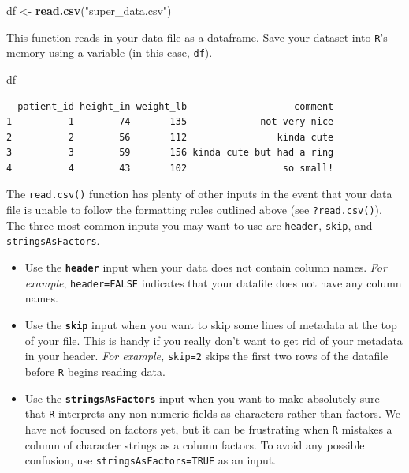 \documentclass[
]{book}
\newenvironment{Shaded}{\begin{snugshade}}{\end{snugshade}}
\newcommand{\KeywordTok}[1]{\textcolor[rgb]{0.13,0.29,0.53}{\textbf{#1}}}
\newcommand{\NormalTok}[1]{#1}
\newcommand{\StringTok}[1]{\textcolor[rgb]{0.31,0.60,0.02}{#1}}
\begin{document}
\begin{Shaded}
\begin{Highlighting}[]
\NormalTok{df <-}\StringTok{ }\KeywordTok{read.csv}\NormalTok{(}\StringTok{"super_data.csv"}\NormalTok{)}
\end{Highlighting}
\end{Shaded}

This function reads in your data file as a dataframe. Save your dataset into \texttt{R}'s memory using a variable (in this case, \texttt{df}).

\begin{Shaded}
\begin{Highlighting}[]
\NormalTok{df}
\end{Highlighting}
\end{Shaded}

\begin{verbatim}
  patient_id height_in weight_lb                   comment
1          1        74       135             not very nice
2          2        56       112                kinda cute
3          3        59       156 kinda cute but had a ring
4          4        43       102                 so small!
\end{verbatim}

The \texttt{read.csv()} function has plenty of other inputs in the event that your data file is unable to follow the formatting rules outlined above (see \texttt{?read.csv()}). The three most common inputs you may want to use are \texttt{header}, \texttt{skip}, and \texttt{stringsAsFactors}.

\begin{itemize}
\item
  Use the \textbf{\texttt{header}} input when your data does not contain column names. \emph{For example}, \texttt{header=FALSE} indicates that your datafile does not have any column names.
\item
  Use the \textbf{\texttt{skip}} input when you want to skip some lines of metadata at the top of your file. This is handy if you really don't want to get rid of your metadata in your header. \emph{For example,} \texttt{skip=2} skips the first two rows of the datafile before \texttt{R} begins reading data.
\item
  Use the \textbf{\texttt{stringsAsFactors}} input when you want to make absolutely sure that \texttt{R} interprets any non-numeric fields as characters rather than factors. We have not focused on factors yet, but it can be frustrating when \texttt{R} mistakes a column of character strings as a column factors. To avoid any possible confusion, use \texttt{stringsAsFactors=TRUE} as an input.
\end{itemize}
\end{document}
